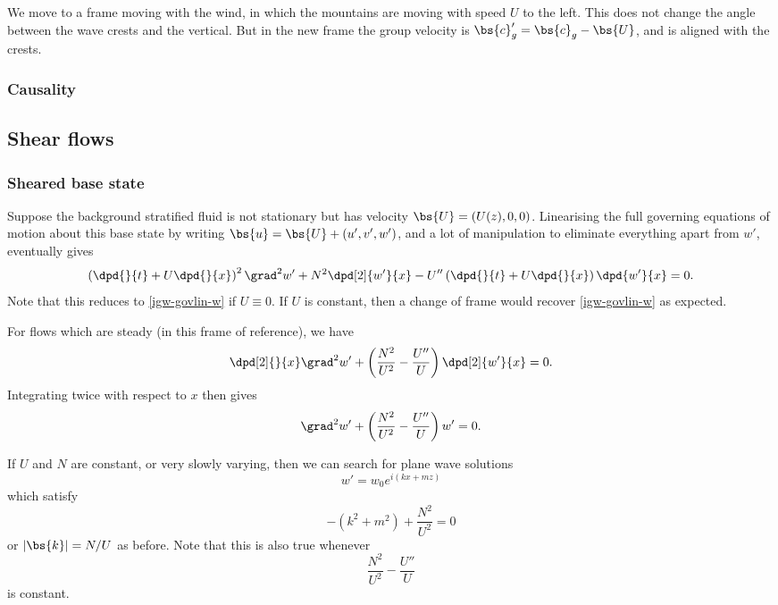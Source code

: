 We move to a frame moving with the wind, in which the mountains are moving with speed $U$ to the left. This does not change the angle between the wave crests and the vertical. But in the new frame the group velocity is $\bs{c}'_g = \bs{c}_g - \bs{U}$, and is aligned with the crests. 

\subsubsection{Causality}

\subsection{Shear flows}

\subsubsection{Sheared base state}

Suppose the background stratified fluid is not stationary but has velocity $\bs{U} = (U(z),0,0)$. Linearising the full governing equations of motion about this base state by writing $\bs{u} = \bs{U} + (u',v',w')$, and a lot of manipulation to eliminate everything apart from $w'$, eventually gives
\begin{equation}
	\left(\dpd{}{t} + U\dpd{}{x}\right)^2 \grad^2 w' + N^2 \dpd[2]{w'}{x} - U''\left(\dpd{}{t} + U\dpd{}{x}\right)\dpd{w'}{x} = 0.
\end{equation}
Note that this reduces to \ref{igw-govlin-w} if $U\equiv0$. If $U$ is constant, then a change of frame would recover \ref{igw-govlin-w} as expected.

For flows which are steady (in this frame of reference), we have
\begin{equation}
	\dpd[2]{}{x} \grad^2 w' + \left( \frac{N^2}{U^2} - \frac{U''}{U} \right)\dpd[2]{w'}{x} = 0.
\end{equation}
Integrating twice with respect to $x$ then gives
\begin{equation}
	\grad^2 w' + \left( \frac{N^2}{U^2} - \frac{U''}{U} \right) w' = 0.
\end{equation}

If $U$ and $N$ are constant, or very slowly varying, then we can search for plane wave solutions
\begin{equation}
	w' = w_0 e^{i(kx+mz)}
\end{equation}
which satisfy
\begin{equation}
	-(k^2 + m^2) + \frac{N^2}{U^2} = 0
\end{equation}
or $|\bs{k}| = N/U$ as before. Note that this is also true whenever
\begin{equation}
	\frac{N^2}{U^2} - \frac{U''}{U} 
\end{equation}
is constant.

